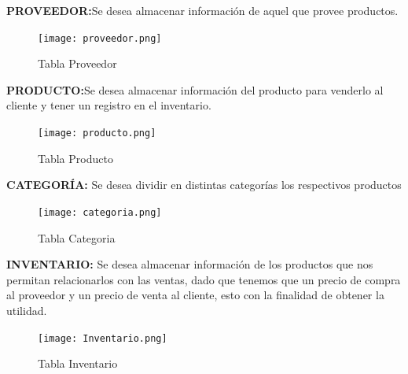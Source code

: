 \documentclass[30pt,fleqn]{article}
\begin{document}
\vspace{15mm} %


\textbf{PROVEEDOR:}Se desea almacenar información de aquel que provee productos. 

\vspace{5mm} %

\begin{figure}[h]
    \centering
    \texttt{[image: proveedor.png]}
    \caption{Tabla Proveedor}
    \label{fig:Tabla Proveedor}
\end{figure}

\vspace{15mm} %

\textbf{PRODUCTO:}Se desea almacenar información del producto para venderlo al cliente y tener un registro en el inventario.

\vspace{5mm} %

\begin{figure}[h]
    \centering
    \texttt{[image: producto.png]}
    \caption{Tabla Producto}
    \label{fig:Tabla Producto}
\end{figure}

\vspace{15mm} %

\textbf{CATEGORÍA:} Se desea dividir en distintas categorías los respectivos productos

\vspace{5mm} %

\begin{figure}[h]
    \centering
    \texttt{[image: categoria.png]}
    \caption{Tabla Categoria}
    \label{fig:Tabla Categoria}
\end{figure}

\vspace{15mm} %


\textbf{INVENTARIO:} Se desea almacenar información de los productos que nos permitan relacionarlos con las ventas, dado que tenemos que un precio de compra al proveedor y un precio de venta al cliente, esto con la finalidad de obtener la utilidad.

\vspace{5mm} %

\begin{figure}[h]
    \centering
    \texttt{[image: Inventario.png]}
    \caption{Tabla Inventario}
    \label{fig:Tabla Inventario}
\end{figure}
\end{document}
